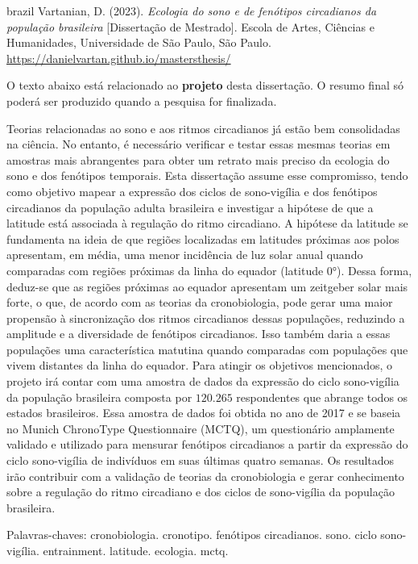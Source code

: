 
\begin{resumo}[RESUMO]
  \begin{otherlanguage*}{brazil}
Vartanian, D. (2023). \emph{Ecologia do sono e de fenótipos circadianos
da população brasileira} {[}Dissertação de Mestrado{]}. Escola de Artes,
Ciências e Humanidades, Universidade de São Paulo, São Paulo.
\url{https://danielvartan.github.io/mastersthesis/}

O texto abaixo está relacionado ao \textbf{projeto} desta dissertação. O
resumo final só poderá ser produzido quando a pesquisa for finalizada.

Teorias relacionadas ao sono e aos ritmos circadianos já estão bem
consolidadas na ciência. No entanto, é necessário verificar e testar
essas mesmas teorias em amostras mais abrangentes para obter um retrato
mais preciso da ecologia do sono e dos fenótipos temporais. Esta
dissertação assume esse compromisso, tendo como objetivo mapear a
expressão dos ciclos de sono-vigília e dos fenótipos circadianos da
população adulta brasileira e investigar a hipótese de que a latitude
está associada à regulação do ritmo circadiano. A hipótese da latitude
se fundamenta na ideia de que regiões localizadas em latitudes próximas
aos polos apresentam, em média, uma menor incidência de luz solar anual
quando comparadas com regiões próximas da linha do equador (latitude
0°). Dessa forma, deduz-se que as regiões próximas ao equador apresentam
um zeitgeber solar mais forte, o que, de acordo com as teorias da
cronobiologia, pode gerar uma maior propensão à sincronização dos ritmos
circadianos dessas populações, reduzindo a amplitude e a diversidade de
fenótipos circadianos. Isso também daria a essas populações uma
característica matutina quando comparadas com populações que vivem
distantes da linha do equador. Para atingir os objetivos mencionados, o
projeto irá contar com uma amostra de dados da expressão do ciclo
sono-vigília da população brasileira composta por \(120.265\)
respondentes que abrange todos os estados brasileiros. Essa amostra de
dados foi obtida no ano de 2017 e se baseia no Munich ChronoType
Questionnaire (MCTQ), um questionário amplamente validado e utilizado
para mensurar fenótipos circadianos a partir da expressão do ciclo
sono-vigília de indivíduos em suas últimas quatro semanas. Os resultados
irão contribuir com a validação de teorias da cronobiologia e gerar
conhecimento sobre a regulação do ritmo circadiano e dos ciclos de
sono-vigília da população brasileira.

Palavras-chaves: cronobiologia. cronotipo. fenótipos circadianos. sono.
ciclo sono-vigília. entrainment. latitude. ecologia. mctq.
  \end{otherlanguage*}
\end{resumo}

